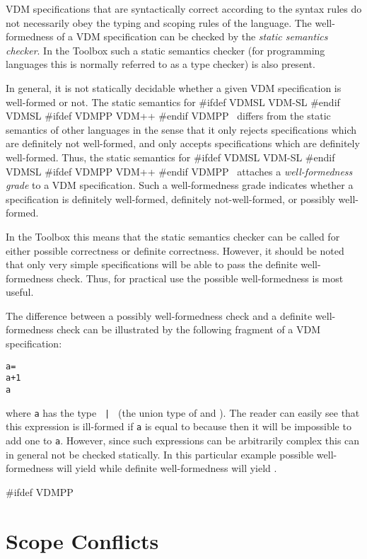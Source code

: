 \documentclass[\pformat,12pt]{article}
\newcommand{\vdmslpp}[2]{%
#ifdef VDMSL
#1
#endif VDMSL
#ifdef VDMPP
#2
#endif VDMPP
}
\newcommand{\vdmsl}{VDM-SL}
\newcommand{\vdmpp}{VDM++}
\begin{document}
VDM specifications that are syntactically correct according to the
syntax rules do not necessarily obey the
typing and scoping rules of the language.
The well-formedness of a
VDM specification can be checked by the {\em static semantics checker}.
In the Toolbox such a static semantics checker (for programming
languages this is normally referred to as a type checker) is also
present.

In general, it is not statically decidable whether a given VDM
specification is well-formed or not.  The static semantics for
\vdmslpp{\vdmsl}{\vdmpp}\ differs from the static semantics of other
languages in the sense that it only rejects specifications which are
definitely not well-formed, and only accepts specifications which are
definitely well-formed.  Thus, the static semantics for
\vdmslpp{\vdmsl}{\vdmpp}\ attaches a {\em well-formedness grade} to a
VDM specification.  Such a well-formedness grade indicates whether a
specification is definitely well-formed, definitely not-well-formed, or
possibly well-formed.

In the Toolbox this means that the static semantics checker can be
called for either possible correctness or definite correctness.
However, it should be noted that only very simple specifications will
be able to pass the definite well-formed\-ness check. Thus, for
practical use the possible well-formedness is most useful.

The difference between a possibly well-formedness check and a definite
well-formedness check can be illustrated by the following
fragment of a VDM specification:
\begin{alltt}
    a =  
    a + 1 
     a
\end{alltt}
where {\tt a} has the type {\tt {} | } (the union
type of
 and
). The reader can easily see that this expression is
ill-formed if {\tt a} is equal to  because then it will be
impossible to add one to {\tt a}. However, since such expressions can
be arbitrarily complex this can in general not be checked statically. In
this particular example possible well-formedness will yield
 while definite well-formedness will yield .

#ifdef VDMPP
\section{Scope Conflicts}
\label{sec:nameconflicts}
\end{document}
